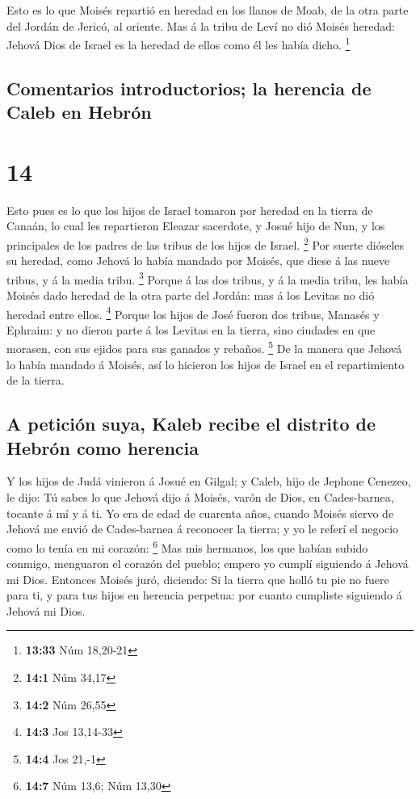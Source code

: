  Esto es lo que Moisés repartió en heredad en los llanos de
Moab, de la otra parte del Jordán de Jericó, al oriente. 
Mas á la tribu de Leví no dió Moisés heredad: Jehová Dios de Israel es
la heredad de ellos como él les había dicho. \footnote{\textbf{13:33}
  Núm 18,20-21}

\hypertarget{comentarios-introductorios-la-herencia-de-caleb-en-hebruxf3n}{%
\subsection{Comentarios introductorios; la herencia de Caleb en
Hebrón}\label{comentarios-introductorios-la-herencia-de-caleb-en-hebruxf3n}}

\hypertarget{section-13}{%
\section{14}\label{section-13}}

 Esto pues es lo que los hijos de Israel tomaron por heredad
en la tierra de Canaán, lo cual les repartieron Eleazar sacerdote, y
Josué hijo de Nun, y los principales de los padres de las tribus de los
hijos de Israel. \footnote{\textbf{14:1} Núm 34,17}  Por
suerte dióseles su heredad, como Jehová lo había mandado por Moisés, que
diese á las nueve tribus, y á la media tribu. \footnote{\textbf{14:2}
  Núm 26,55}  Porque á las dos tribus, y á la media tribu,
les había Moisés dado heredad de la otra parte del Jordán: mas á los
Levitas no dió heredad entre ellos. \footnote{\textbf{14:3} Jos 13,14-33}
 Porque los hijos de José fueron dos tribus, Manasés y
Ephraim: y no dieron parte á los Levitas en la tierra, sino ciudades en
que morasen, con sus ejidos para sus ganados y rebaños. \footnote{\textbf{14:4}
  Jos 21,-1}  De la manera que Jehová lo había mandado á
Moisés, así lo hicieron los hijos de Israel en el repartimiento de la
tierra.

\hypertarget{a-peticiuxf3n-suya-kaleb-recibe-el-distrito-de-hebruxf3n-como-herencia}{%
\subsection{A petición suya, Kaleb recibe el distrito de Hebrón como
herencia}\label{a-peticiuxf3n-suya-kaleb-recibe-el-distrito-de-hebruxf3n-como-herencia}}

 Y los hijos de Judá vinieron á Josué en Gilgal; y Caleb,
hijo de Jephone Cenezeo, le dijo: Tú sabes lo que Jehová dijo á Moisés,
varón de Dios, en Cades-barnea, tocante á mí y á ti.  Yo era
de edad de cuarenta años, cuando Moisés siervo de Jehová me envió de
Cades-barnea á reconocer la tierra; y yo le referí el negocio como lo
tenía en mi corazón: \footnote{\textbf{14:7} Núm 13,6; Núm 13,30}
 Mas mis hermanos, los que habían subido conmigo, menguaron
el corazón del pueblo; empero yo cumplí siguiendo á Jehová mi Dios.
 Entonces Moisés juró, diciendo: Si la tierra que holló tu
pie no fuere para ti, y para tus hijos en herencia perpetua: por cuanto
cumpliste siguiendo á Jehová mi Dios.

